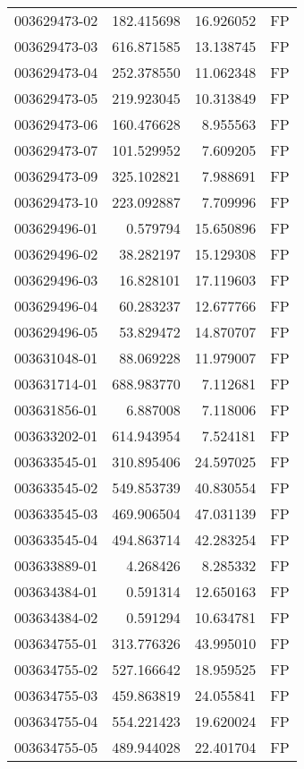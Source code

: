 \begin{tabular}{lrrl}
003629473-02 &  182.415698 &    16.926052 &   FP \\
003629473-03 &  616.871585 &    13.138745 &   FP \\
003629473-04 &  252.378550 &    11.062348 &   FP \\
003629473-05 &  219.923045 &    10.313849 &   FP \\
003629473-06 &  160.476628 &     8.955563 &   FP \\
003629473-07 &  101.529952 &     7.609205 &   FP \\
003629473-09 &  325.102821 &     7.988691 &   FP \\
003629473-10 &  223.092887 &     7.709996 &   FP \\
003629496-01 &    0.579794 &    15.650896 &   FP \\
003629496-02 &   38.282197 &    15.129308 &   FP \\
003629496-03 &   16.828101 &    17.119603 &   FP \\
003629496-04 &   60.283237 &    12.677766 &   FP \\
003629496-05 &   53.829472 &    14.870707 &   FP \\
003631048-01 &   88.069228 &    11.979007 &   FP \\
003631714-01 &  688.983770 &     7.112681 &   FP \\
003631856-01 &    6.887008 &     7.118006 &   FP \\
003633202-01 &  614.943954 &     7.524181 &   FP \\
003633545-01 &  310.895406 &    24.597025 &   FP \\
003633545-02 &  549.853739 &    40.830554 &   FP \\
003633545-03 &  469.906504 &    47.031139 &   FP \\
003633545-04 &  494.863714 &    42.283254 &   FP \\
003633889-01 &    4.268426 &     8.285332 &   FP \\
003634384-01 &    0.591314 &    12.650163 &   FP \\
003634384-02 &    0.591294 &    10.634781 &   FP \\
003634755-01 &  313.776326 &    43.995010 &   FP \\
003634755-02 &  527.166642 &    18.959525 &   FP \\
003634755-03 &  459.863819 &    24.055841 &   FP \\
003634755-04 &  554.221423 &    19.620024 &   FP \\
003634755-05 &  489.944028 &    22.401704 &   FP \\

\end{tabular}

